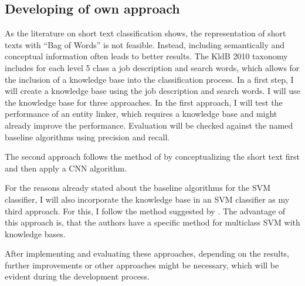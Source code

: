\documentclass[a4paper]{article}
\begin{document}
\subsection*{Developing of own approach}
As the literature on short text classification shows, the representation of short texts with ``Bag of Words'' is not feasible. Instead, including semantically and conceptual information often leads to better results. The KldB 2010 taxonomy includes for each level 5 class a job description and search words, which allows for the inclusion of a knowledge base into the classification process. In a first step, I will create a knowledge base using the job description and search words. I will use the knowledge base for three approaches. 
In the first approach, I will test the performance of an entity linker, which requires a knowledge base and might already improve the performance. Evaluation will be checked against the named baseline algorithms using precision and recall.

The second approach follows the method of \cite{WangJ2017} by conceptualizing the short text first and then apply a CNN algorithm. 

For the reasons already stated about the baseline algorithms for the SVM classifier, I will also incorporate the knowledge base in an SVM classifier as my third approach. For this, I follow the method suggested by \cite{Le2006}. The advantage of this approach is, that the authors have a specific method for multiclass SVM with knowledge bases. 

After implementing and evaluating these approaches, depending on the results, further improvements or other approaches might be necessary, which will be evident during the development process. 
\end{document}
